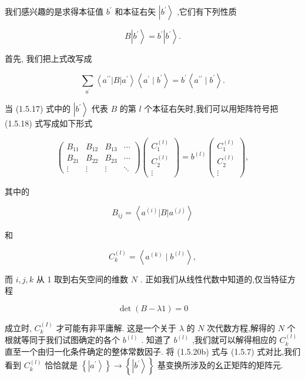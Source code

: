 \documentclass[lang=cn,newtx,10pt,scheme=chinese,thmcnt=section]{elegantbook}
\begin{document}
我们感兴趣的是求得本征值 ${b}^{\prime }$ 和本征右矢 $\left| {b}^{\prime }\right\rangle$ ,它们有下列性质

$$
B\left| {b}^{\prime }\right\rangle = {b}^{\prime }\left| {b}^{\prime }\right\rangle . \tag{1. 5.17}
$$

首先, 我们把上式改写成

$$
\mathop{\sum }\limits_{{a}^{\prime }}\left\langle {{a}^{\prime \prime }\left| B\right| {a}^{\prime }}\right\rangle \left\langle {{a}^{\prime } \mid {b}^{\prime }}\right\rangle = {b}^{\prime }\left\langle {{a}^{\prime \prime } \mid {b}^{\prime }}\right\rangle . \tag{1. 5.18}
$$

当 (1.5.17) 式中的 $\left| {b}^{\prime }\right\rangle$ 代表 $B$ 的第 $l$ 个本征右矢时,我们可以用矩阵符号把 (1.5.18) 式写成如下形式

$$
\left( \begin{matrix} {B}_{11} & {B}_{12} & {B}_{13} & \cdots \\ {B}_{21} & {B}_{22} & {B}_{23} & \cdots \\ \vdots & \vdots & \vdots & \ddots \end{matrix}\right) \left( \begin{matrix} {C}_{1}^{\left( l\right) } \\ {C}_{2}^{\left( l\right) } \\ \vdots \end{matrix}\right) = {b}^{\left( l\right) }\left( \begin{matrix} {C}_{1}^{\left( l\right) } \\ {C}_{2}^{\left( l\right) } \\ \vdots \end{matrix}\right) , \tag{1.5.19}
$$

其中的

$$
{B}_{ij} = \left\langle {{a}^{\left( i\right) }\left| B\right| {a}^{\left( j\right) }}\right\rangle \tag{1.5.20a}
$$

和

$$
{C}_{k}^{\left( l\right) } = \left\langle {{a}^{\left( k\right) } \mid {b}^{\left( l\right) }}\right\rangle , \tag{1.5.20b}
$$

而 $i, j, k$ 从 1 取到右矢空间的维数 $N$ . 正如我们从线性代数中知道的,仅当特征方程

$$
\det \left( {B - {\lambda 1}}\right) = 0 \tag{1.5.21}
$$

成立时, ${C}_{k}^{\left( I\right) }$ 才可能有非平庸解. 这是一个关于 $\lambda$ 的 $N$ 次代数方程,解得的 $N$ 个根就等同于我们试图确定的各个 ${b}^{\left( l\right) }$ . 知道了 ${b}^{\left( l\right) }$ ,我们就可以解得相应的 ${C}_{k}^{\left( l\right) }$ 直至一个由归一化条件确定的整体常数因子. 将 (1.5.20b) 式与 (1.5.7) 式对比,我们看到 ${C}_{k}^{\left( l\right) }$ 恰恰就是 $\left\{ \left| {a}^{\prime }\right\rangle \right\} \rightarrow \left\{ \left| {b}^{\prime }\right\rangle \right\}$ 基变换所涉及的幺正矩阵的矩阵元.
\end{document}
